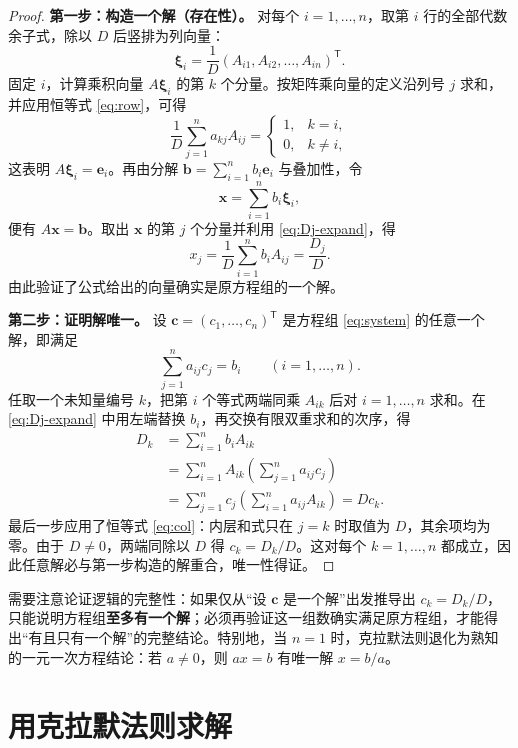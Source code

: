 \documentclass[UTF8, fontset=fandol, a4paper, 12pt]{ctexart}
\theoremstyle{definition}
\begin{document}
\begin{proof}
\textbf{第一步：构造一个解（存在性）。}
对每个 $i=1,\ldots,n$，取第 $i$ 行的全部代数余子式，除以 $D$ 后竖排为列向量：
\[
 \boldsymbol\xi_i
 =\frac1D(A_{i1},A_{i2},\ldots,A_{in})^{\mathsf T}.
\]
固定 $i$，计算乘积向量 $A\boldsymbol\xi_i$ 的第 $k$ 个分量。按矩阵乘向量的定义沿列号 $j$ 求和，并应用恒等式 \eqref{eq:row}，可得
\[
 \frac1D\sum_{j=1}^n a_{kj}A_{ij}
 =\begin{cases}1,&k=i,\\0,&k\ne i,\end{cases}
\]
这表明 $A\boldsymbol\xi_i=\boldsymbol e_i$。再由分解 $\boldsymbol b=\sum_{i=1}^n b_i\boldsymbol e_i$ 与叠加性，令
\[
 \boldsymbol x=\sum_{i=1}^n b_i\boldsymbol\xi_i,
\]
便有 $A\boldsymbol x=\boldsymbol b$。取出 $\boldsymbol x$ 的第 $j$ 个分量并利用 \eqref{eq:Dj-expand}，得
\[
 x_j=\frac1D\sum_{i=1}^n b_iA_{ij}=\frac{D_j}{D}.
\]
由此验证了公式给出的向量确实是原方程组的一个解。

\medskip
\textbf{第二步：证明解唯一。}
设 $\boldsymbol c=(c_1,\ldots,c_n)^{\mathsf T}$ 是方程组 \eqref{eq:system} 的任意一个解，即满足
\[
 \sum_{j=1}^n a_{ij}c_j=b_i\qquad(i=1,\ldots,n).
\]
任取一个未知量编号 $k$，把第 $i$ 个等式两端同乘 $A_{ik}$ 后对 $i=1,\ldots,n$ 求和。在 \eqref{eq:Dj-expand} 中用左端替换 $b_i$，再交换有限双重求和的次序，得
\begin{align*}
 D_k
 &=\sum_{i=1}^n b_iA_{ik}\\
 &=\sum_{i=1}^n A_{ik}\left(\sum_{j=1}^n a_{ij}c_j\right)\\
 &=\sum_{j=1}^n c_j\left(\sum_{i=1}^n a_{ij}A_{ik}\right)
 =Dc_k.
\end{align*}
最后一步应用了恒等式 \eqref{eq:col}：内层和式只在 $j=k$ 时取值为 $D$，其余项均为零。由于 $D\ne0$，两端同除以 $D$ 得 $c_k=D_k/D$。这对每个 $k=1,\ldots,n$ 都成立，因此任意解必与第一步构造的解重合，唯一性得证。
\end{proof}

需要注意论证逻辑的完整性：如果仅从“设 $\boldsymbol c$ 是一个解”出发推导出 $c_k=D_k/D$，只能说明方程组\textbf{至多有一个解}；必须再验证这一组数确实满足原方程组，才能得出“有且只有一个解”的完整结论。特别地，当 $n=1$ 时，克拉默法则退化为熟知的一元一次方程结论：若 $a\ne0$，则 $ax=b$ 有唯一解 $x=b/a$。

\section{用克拉默法则求解}
\end{document}
